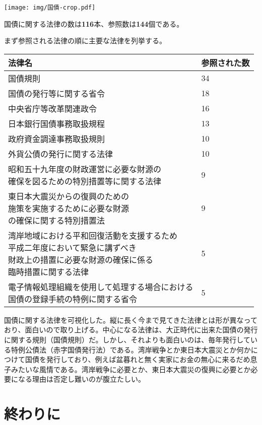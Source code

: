 \documentclass[a5j,openany,twoside]{jsbook}
\begin{document}
\texttt{[image: img/国債-crop.pdf]}

国債に関する法律の数は\textbf{116}本、参照数は\textbf{144}個である。

まず参照される法律の順に主要な法律を列挙する。

\begin{table}[htb]
  \begin{tabular}{|l|l|}  \hline
法律名 & 参照された数 \\ \hline \hline
国債規則 & 34 \\
国債の発行等に関する省令 & 18 \\
中央省庁等改革関連政令 & 16 \\
日本銀行国債事務取扱規程 & 13 \\
政府資金調達事務取扱規則 & 10 \\
外貨公債の発行に関する法律 & 10 \\
\shortstack{昭和五十九年度の財政運営に必要な財源の\\確保を図るための特別措置等に関する法律} & 9 \\
\shortstack{東日本大震災からの復興のための\\施策を実施するために必要な財源\\の確保に関する特別措置法} & 9 \\
\shortstack{湾岸地域における平和回復活動を支援するため\\平成二年度において緊急に講ずべき\\財政上の措置に必要な財源の確保に係る\\臨時措置に関する法律} & 5 \\
\shortstack{電子情報処理組織を使用して処理する場合における\\国債の登録手続の特例に関する省令} & 5  \\ \hline
  \end{tabular}
\end{table}

国債に関する法律を可視化した。縦に長く今まで見てきた法律とは形が異なっており、面白いので取り上げる。中心になる法律は、大正時代に出来た国債の発行に関する規則（国債規則）だ。しかし、それよりも面白いのは、毎年発行している特例公債法（赤字国債発行法）である。湾岸戦争とか東日本大震災とか何かにつけて国債を発行しており、例えば盆暮れと無く実家にお金の無心に来るだめ息子みたいな風情である。湾岸戦争に必要とか、東日本大震災の復興に必要とか必要になる理由は否定し難いのが腹立たしい。

\chapter{終わりに}
\end{document}
